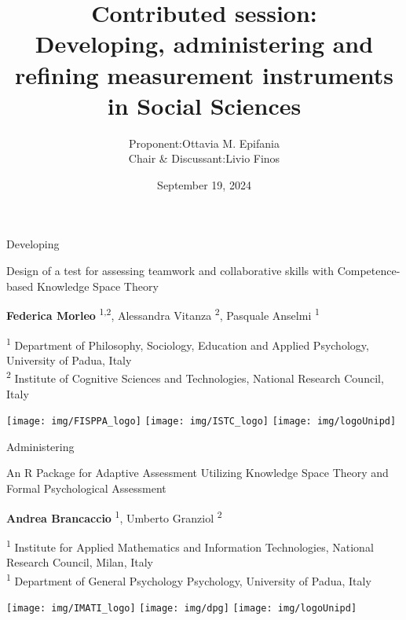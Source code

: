 \documentclass{beamer}
\title{Contributed session: \\ Developing, administering and refining measurement instruments in Social Sciences}
\author{\begin{tabular}{rl}
		 Proponent:&  Ottavia M. Epifania \\ 
		 Chair \& Discussant: & Livio Finos \\
	\end{tabular} }
\date{September 19, 2024}
\institute{
	\centering
	\texttt{[image: img/qr-code-asa.png]}}
\begin{document}
\begin{frame}[plain]
    \maketitle
\end{frame}
\begin{frame}{Developing}
	\begin{center}
		\begin{Large}
					Design of a test for assessing teamwork and collaborative skills with Competence-based Knowledge Space Theory
		\end{Large}

		
		\vspace{5mm}
		\textbf{Federica Morleo }\textsuperscript{1,2}, Alessandra Vitanza \textsuperscript{2}, Pasquale Anselmi \textsuperscript{1}
		
		\small
		\vspace{3mm}
		\textsuperscript{1}	Department of Philosophy, Sociology, Education and Applied Psychology, University of Padua, Italy \\
		\textsuperscript{2}	Institute of Cognitive Sciences and Technologies, National Research Council, Italy
		
	\end{center}
\centering
\texttt{[image: img/FISPPA\_logo]} \hspace{5mm} \texttt{[image: img/ISTC\_logo]} \hspace{8mm} \texttt{[image: img/logoUnipd]}

\end{frame}

\begin{frame}{Administering}
	\begin{center}
		\begin{Large}
	An R Package for Adaptive Assessment Utilizing Knowledge Space Theory and Formal Psychological Assessment
		\end{Large}
		
		
		\vspace{5mm}
\textbf{Andrea Brancaccio} \textsuperscript{1}, Umberto Granziol \textsuperscript{2}

		\small
		\vspace{3mm}
		\textsuperscript{1} Institute for Applied Mathematics and Information Technologies, National Research Council, Milan, Italy \\
		\textsuperscript{1}	Department of General Psychology Psychology, University of Padua, Italy
		
	\end{center}
	
	\centering
	\texttt{[image: img/IMATI\_logo]} \hspace{8mm}
	\texttt{[image: img/dpg]} \hspace{5mm}  \texttt{[image: img/logoUnipd]}
	
\end{frame}
\end{document}

